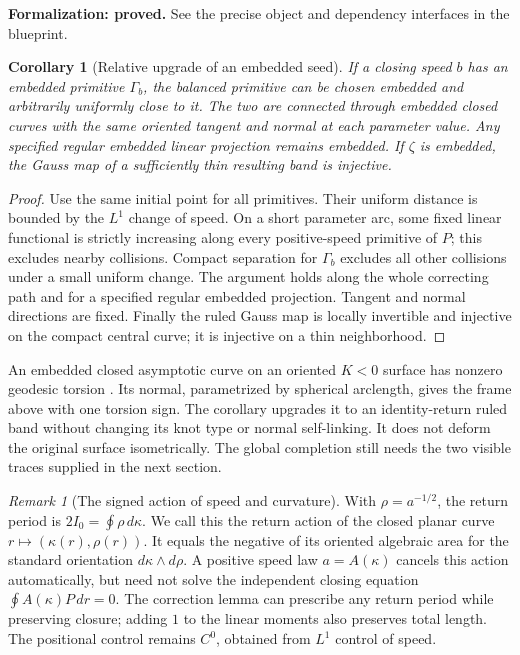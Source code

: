 \documentclass[11pt]{amsart}
\newtheorem{corollary}[theorem]{Corollary}
\theoremstyle{definition}
\theoremstyle{remark}
\newtheorem{remark}[theorem]{Remark}
\numberwithin{equation}{section}
\begin{document}
\par\noindent\textbf{Formalization: proved.} See the precise object and dependency interfaces in the blueprint.\par
\begin{corollary}[Relative upgrade of an embedded seed]\label{cor:relative-holonomy-upgrade}
If a closing speed $b$ has an embedded primitive $\Gamma_b$, the balanced
primitive can be chosen embedded and arbitrarily uniformly close to it.
The two are connected through embedded closed curves with the same oriented
tangent and normal at each parameter value. Any specified regular embedded
linear projection remains embedded. If $\zeta$ is embedded, the Gauss map
of a sufficiently thin resulting band is injective.
\end{corollary}
\begin{proof}
Use the same initial point for all primitives. Their uniform distance is
bounded by the $L^1$ change of speed. On a short parameter arc, some fixed
linear functional is strictly increasing along every positive-speed
primitive of $P$; this excludes nearby collisions. Compact separation for
$\Gamma_b$ excludes all other collisions under a small uniform change.
The argument holds along the whole correcting path and for a specified
regular embedded projection. Tangent and normal directions are fixed.
Finally the ruled Gauss map is locally invertible and injective on the
compact central curve; it is injective on a thin neighborhood.
\end{proof}
An embedded closed asymptotic curve on an oriented $K<0$ surface has
nonzero geodesic torsion \cite[\S2.2]{GR}. Its normal, parametrized by
spherical arclength, gives the frame above with one torsion sign. The
corollary upgrades it to an identity-return ruled band without changing
its knot type or normal self-linking. It does not deform the original
surface isometrically. The global completion still needs the two visible
traces supplied in the next section.

\begin{remark}[The signed action of speed and curvature]\label{rem:holonomy-action}
With $\rho=a^{-1/2}$, the return period is $2I_0=\oint\rho\,d\kappa$.
We call this the return action of the closed planar curve
$r\mapsto(\kappa(r),\rho(r))$. It equals the negative of its oriented
algebraic area for the standard orientation $d\kappa\wedge d\rho$.
A positive speed law $a=A(\kappa)$ cancels
this action automatically, but need not solve the independent closing
equation $\oint A(\kappa)P\,dr=0$. The correction lemma can prescribe
any return period while preserving closure; adding $1$ to the linear
moments also preserves total length. The positional control remains
$C^0$, obtained from $L^1$ control of speed.
\end{remark}
\end{document}
